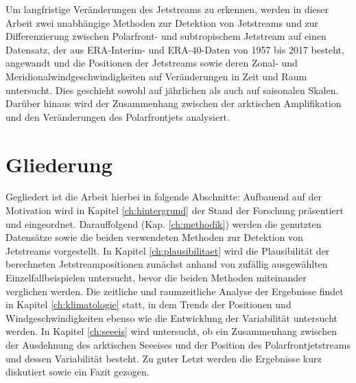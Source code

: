 Um langfristige Veränderungen des Jetstreams zu erkennen, werden in dieser Arbeit zwei unabhängige Methoden zur Detektion von Jetstreams und zur Differenzierung zwischen Polarfront- und subtropischem Jetstream auf einen Datensatz, der aus ERA-Interim- und ERA-40-Daten von 1957 bis 2017 besteht, angewandt und die Positionen der Jetstreams sowie deren Zonal- und Meridionalwindgeschwindigkeiten auf Veränderungen in Zeit und Raum untersucht. Dies geschieht sowohl auf jährlichen als auch auf saisonalen Skalen. Darüber hinaus wird der Zusammenhang zwischen der arktischen Amplifikation und den Veränderungen des Polarfrontjets analysiert.

\section*{Gliederung}
Gegliedert ist die Arbeit hierbei in folgende Abschnitte: Aufbauend auf der Motivation wird in Kapitel \ref{ch:hintergrund} der Stand der Forschung präsentiert und eingeordnet. Darauffolgend (Kap. \ref{ch:methodik}) werden die genutzten Datensätze sowie die beiden verwendeten Methoden zur Detektion von Jetstreams vorgestellt. In Kapitel \ref{ch:plausibilitaet} wird die Plausibilität der berechneten Jetstreampositionen zunächst anhand von zufällig ausgewählten Einzelfallbeispielen untersucht, bevor die beiden Methoden miteinander verglichen werden. Die zeitliche und raumzeitliche Analyse der Ergebnisse findet in Kapitel \ref{ch:klimatologie} statt, in dem Trends der Positionen und Windgeschwindigkeiten ebenso wie die Entwicklung der Variabilität untersucht werden. In Kapitel \ref{ch:seeeis} wird untersucht, ob ein Zusammenhang zwischen der Ausdehnung des arktischen Seeeises und der Position des Polarfrontjetstreams und dessen Variabilität besteht. Zu guter Letzt werden die Ergebnisse kurz diskutiert sowie ein Fazit gezogen.
